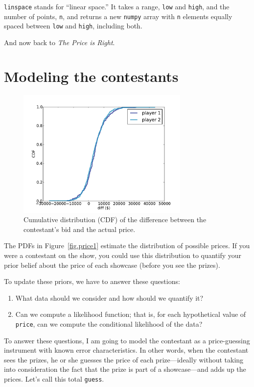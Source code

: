\documentclass[12pt]{book}
\begin{document}
{\tt linspace} stands for
``linear space.''  It takes a range, {\tt low} and {\tt high}, and
the number of points, {\tt n}, and returns a new {\tt numpy}
array with {\tt n} elements equally spaced between {\tt low} and
{\tt high}, including both.

And now back to {\it The Price is Right}.


\section{Modeling the contestants}

\begin{figure}
\centerline{\includegraphics[height=2.5in]{figs/price2.pdf}}
\caption{Cumulative distribution (CDF) of the difference between the
  contestant's bid and the actual price.}
\label{fig.price2}
\end{figure}

The PDFs in Figure~\ref{fig.price1} estimate the distribution of
possible prices.  If you were a contestant on the
show, you could use this distribution to quantify your prior belief
about the price of each showcase (before you see the prizes).

To update these priors, we have to answer these questions:

\begin{enumerate}

\item What data should we consider and how should we quantify it?

\item Can we compute a likelihood function; that is,
  for each hypothetical value of {\tt price}, can we compute
  the conditional likelihood of the data?

\end{enumerate}

To answer these questions, I am going to model the contestant
as a price-guessing instrument with known error characteristics.
In other words, when the contestant sees the prizes, he or she
guesses the price of each prize---ideally without taking into
consideration the fact that the prize is part of a showcase---and
adds up the prices.  Let's call this total {\tt guess}.
\end{document}
